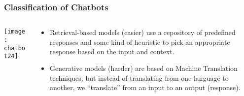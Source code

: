 \begin{frame}[fragile]\frametitle{Classification of Chatbots}
    \begin{columns}
    \begin{column}[t]{0.5\linewidth}
	
\begin{center}
\texttt{[image: chatbot24]}
\end{center}
    \end{column}
    \begin{column}[t]{0.5\linewidth}

\begin{itemize}
\item Retrieval-based models (easier) use a repository of predefined responses and some kind of heuristic to pick an appropriate response based on the input and context. 
\item Generative models (harder) are based on Machine Translation techniques, but instead of translating from one language to another, we ``translate'' from an input to an output (response).
\end{itemize}
    \end{column}
    \end{columns}

\end{frame}







